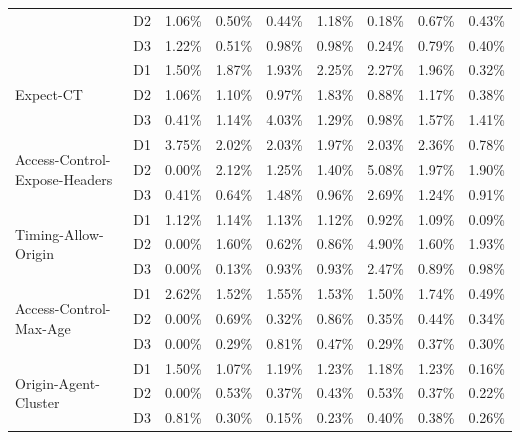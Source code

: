 \begin{table}[!ht]
\begin{tabular}{l|c|c|c|c|c|c|c|c}
        ~ & D2 & 1.06\% & 0.50\% & 0.44\% & 1.18\% & 0.18\% & 0.67\% & 0.43\% \\
        ~ & D3 & 1.22\% & 0.51\% & 0.98\% & 0.98\% & 0.24\% & 0.79\% & 0.40\% \\ \hline
        \multirow{3}{*}{Expect-CT} & D1 & 1.50\% & 1.87\% & 1.93\% & 2.25\% & 2.27\% & 1.96\% & 0.32\% \\
        ~ & D2 & 1.06\% & 1.10\% & 0.97\% & 1.83\% & 0.88\% & 1.17\% & 0.38\% \\
        ~ & D3 & 0.41\% & 1.14\% & 4.03\% & 1.29\% & 0.98\% & 1.57\% & 1.41\% \\ \hline
        \multirow{3}{*}{Access-Control-Expose-Headers} & D1 & 3.75\% & 2.02\% & 2.03\% & 1.97\% & 2.03\% & 2.36\% & 0.78\% \\
        ~ & D2 & 0.00\% & 2.12\% & 1.25\% & 1.40\% & 5.08\% & 1.97\% & 1.90\% \\
        ~ & D3 & 0.41\% & 0.64\% & 1.48\% & 0.96\% & 2.69\% & 1.24\% & 0.91\% \\ \hline
        \multirow{3}{*}{Timing-Allow-Origin} & D1 & 1.12\% & 1.14\% & 1.13\% & 1.12\% & 0.92\% & 1.09\% & 0.09\% \\
        ~ & D2 & 0.00\% & 1.60\% & 0.62\% & 0.86\% & 4.90\% & 1.60\% & 1.93\% \\ 
        ~ & D3 & 0.00\% & 0.13\% & 0.93\% & 0.93\% & 2.47\% & 0.89\% & 0.98\% \\ \hline
        \multirow{3}{*}{Access-Control-Max-Age} & D1 & 2.62\% & 1.52\% & 1.55\% & 1.53\% & 1.50\% & 1.74\% & 0.49\% \\
        ~ & D2 & 0.00\% & 0.69\% & 0.32\% & 0.86\% & 0.35\% & 0.44\% & 0.34\% \\
        ~ & D3 & 0.00\% & 0.29\% & 0.81\% & 0.47\% & 0.29\% & 0.37\% & 0.30\% \\ \hline
        \multirow{3}{*}{Origin-Agent-Cluster} & D1 & 1.50\% & 1.07\% & 1.19\% & 1.23\% & 1.18\% & 1.23\% & 0.16\% \\
        ~ & D2 & 0.00\% & 0.53\% & 0.37\% & 0.43\% & 0.53\% & 0.37\% & 0.22\% \\
        ~ & D3 & 0.81\% & 0.30\% & 0.15\% & 0.23\% & 0.40\% & 0.38\% & 0.26\% \\ \bottomrule
    \end{tabular}
\end{table}